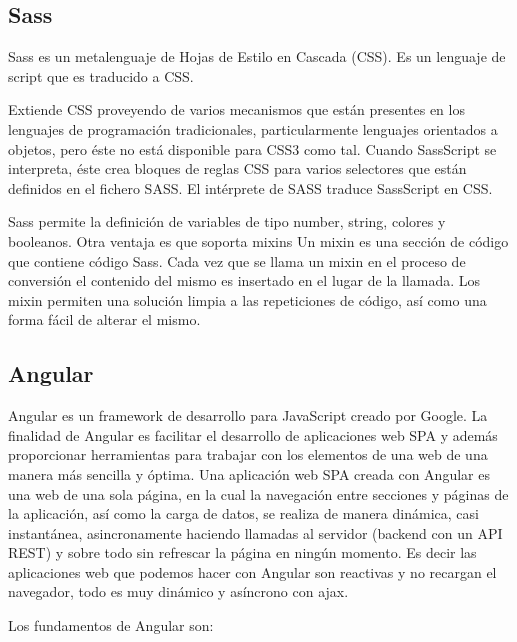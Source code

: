 \documentclass[a4paper, 12pt]{book}
\begin{document}
\subsection{Sass}
\label{subsec:estilo}

Sass es un metalenguaje de Hojas de Estilo en Cascada (CSS). Es un lenguaje de script que
es traducido a CSS.

Extiende CSS proveyendo de varios mecanismos que est\'an presentes en los lenguajes de
programaci\'on tradicionales, particularmente lenguajes orientados a objetos, pero \'este no est\'a
disponible para CSS3 como tal. Cuando SassScript se interpreta, \'este crea bloques de reglas CSS
para varios selectores que est\'an definidos en el fichero SASS. El int\'erprete de SASS traduce
SassScript en CSS.

Sass permite la definici\'on de variables de tipo number, string, colores y booleanos. Otra
ventaja es que soporta mixins Un mixin es una secci\'on de c\'odigo que contiene c\'odigo Sass.
Cada vez que se llama un mixin en el proceso de conversi\'on el contenido del mismo es insertado
en el lugar de la llamada. Los mixin permiten una soluci\'on limpia a las repeticiones de c\'odigo,
as\'i como una forma f\'acil de alterar el mismo.


\subsection{Angular}
\label{subsec:estilo}

Angular es un framework de desarrollo para JavaScript creado por Google. La finalidad de Angular es facilitar el desarrollo de aplicaciones web SPA y adem\'as proporcionar herramientas para trabajar con los elementos de una web de una manera m\'as sencilla y \'optima. Una aplicaci\'on web SPA creada con Angular es una web de una sola p\'agina, en la cual la navegaci\'on entre secciones y p\'aginas de la aplicaci\'on, as\'i como la carga de datos, se realiza de manera din\'amica, casi instant\'anea, asincronamente haciendo llamadas al servidor (backend con un API REST) y sobre todo sin refrescar la p\'agina en ning\'un momento. Es decir las aplicaciones web que podemos hacer con Angular son reactivas y no recargan el navegador, todo es muy din\'amico y as\'incrono con ajax.

Los fundamentos de Angular son: 
\end{document}
